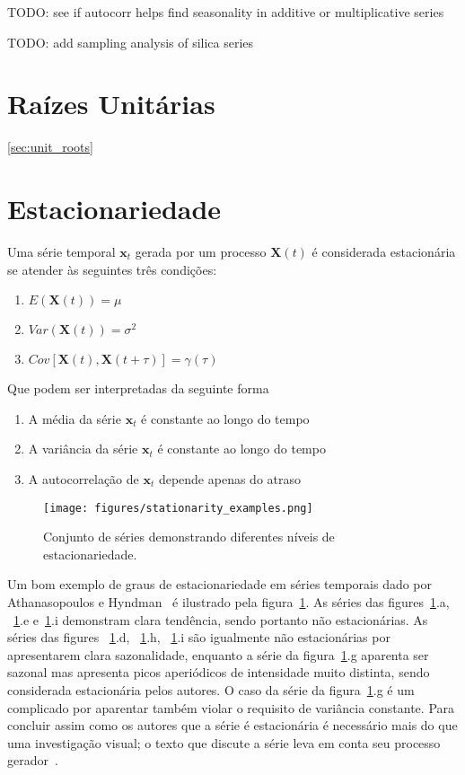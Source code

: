 TODO: see if autocorr helps find seasonality in additive or multiplicative series

TODO: add sampling analysis of silica series


\section{Raízes Unitárias}\ref{sec:unit_roots}

\section{Estacionariedade}\label{sec:stationarity}

Uma série temporal $\mathbf{x}_t$ gerada por um processo $\mathbf{X}(t)$ é
considerada estacionária se atender às seguintes três condições:

\begin{enumerate}
    \item $E(\mathbf{X}(t)) = \mu$
    \item $Var(\mathbf{X}(t)) = \sigma^2$
    \item $Cov[\mathbf{X}(t), \mathbf{X}(t+\tau)] = \gamma(\tau)$
\end{enumerate}\vspace{.5cm}

Que podem ser interpretadas da seguinte forma

\begin{enumerate}
    \item A média da série $\mathbf{x}_t$ é constante ao longo do tempo
    \item A variância da série $\mathbf{x}_t$ é constante ao longo do tempo
    \item A autocorrelação de $\mathbf{x}_t$ depende apenas do atraso
\end{enumerate}\vspace{.5cm}

\begin{figure}[h]
    \centering
    \texttt{[image: figures/stationarity\_examples.png]}
    \caption{Conjunto de séries demonstrando diferentes níveis de
    estacionariedade.}
    \label{fig:stationarity}
\end{figure}

Um bom exemplo de graus de estacionariedade em séries temporais dado por
Athanasopoulos e Hyndman~\cite{athana} é ilustrado pela
figura~\ref{fig:stationarity}. As séries das figures~\ref{fig:stationarity}.a,
~\ref{fig:stationarity}.e e~\ref{fig:stationarity}.i demonstram clara
tendência, sendo portanto não estacionárias. As séries das figures
~\ref{fig:stationarity}.d, ~\ref{fig:stationarity}.h, ~\ref{fig:stationarity}.i
são igualmente não estacionárias por apresentarem clara sazonalidade, enquanto
a série da figura~\ref{fig:stationarity}.g aparenta ser sazonal mas apresenta
picos aperiódicos de intensidade muito distinta, sendo considerada estacionária
pelos autores. O caso da série da figura~\ref{fig:stationarity}.g é um
complicado por aparentar também violar o requisito de variância constante. Para
concluir assim como os autores que a série é estacionária é necessário mais do
que uma investigação visual; o texto que discute a série leva em conta seu
processo gerador~\cite{athana}.

